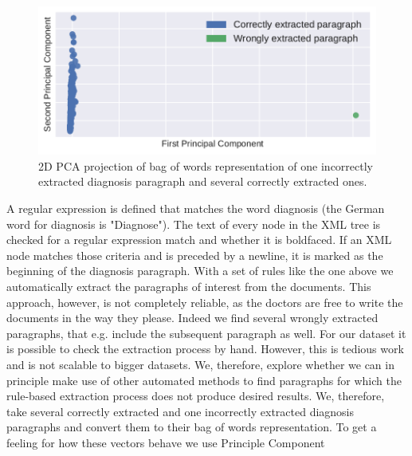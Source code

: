 
\bigskip
\begin{figure}
	\includegraphics[width=\linewidth]{figures/bow_find_odd}
	\caption{2D PCA projection of bag of words representation of one incorrectly extracted diagnosis paragraph and several correctly extracted ones.}
	\label{fig:bow_find_odd}
\end{figure}
A regular expression is defined that matches the word diagnosis (the German word for diagnosis is "Diagnose").
The text of every node in the XML tree is checked for a regular expression match and whether it is boldfaced. If an XML node matches those criteria and is preceded by a newline, it is marked as the beginning of the diagnosis paragraph.
With a set of rules like the one above we automatically extract the
paragraphs of interest from the documents. This approach, however,
is not completely reliable, as the doctors are free to write the documents
in the way they please. Indeed we find several wrongly extracted paragraphs,
that e.g. include the subsequent paragraph as well. For our dataset
it is possible to check the extraction process by hand. However, this
is tedious work and is not scalable to bigger
datasets. We, therefore, explore whether we can in principle make use
of other automated methods to find paragraphs for which the rule-based extraction
process does not produce desired results. We, therefore, take several correctly extracted and one incorrectly extracted
diagnosis paragraphs and convert them to their bag of words representation.
To get a feeling for how these vectors behave we use Principle Component
